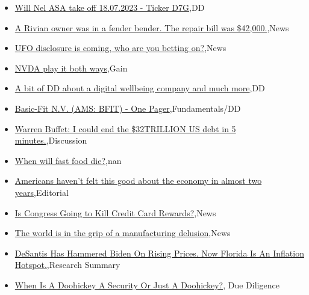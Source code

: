 \documentclass{article}%
\begin{document}
%
\begin{itemize}%
\item%
\href{https://reddit.com/r/wallstreetbets/comments/150759x/will\_nel\_asa\_take\_off\_18072023\_ticker\_d7g/}{Will Nel ASA take off 18.07.2023 - Ticker D7G},DD%
\item%
\href{https://reddit.com/r/wallstreetbets/comments/1502x32/a\_rivian\_owner\_was\_in\_a\_fender\_bender\_the\_repair/}{A Rivian owner was in a fender bender. The repair bill was \$42,000.},News%
\item%
\href{https://reddit.com/r/wallstreetbets/comments/1500kqc/ufo\_disclosure\_is\_coming\_who\_are\_you\_betting\_on/}{UFO disclosure is coming, who are you betting on?},News%
\item%
\href{https://reddit.com/r/wallstreetbets/comments/15000ez/nvda\_play\_it\_both\_ways/}{NVDA play it both ways},Gain%
\item%
\href{https://reddit.com/r/Baystreetbets/comments/1505t6w/a\_bit\_of\_dd\_about\_a\_digital\_wellbeing\_company\_and/}{A bit of DD about a digital wellbeing company and much more},DD%
\item%
\href{https://reddit.com/r/StockMarket/comments/14zzat4/basicfit\_nv\_ams\_bfit\_one\_pager/}{Basic-Fit N.V. (AMS: BFIT) - One Pager},Fundamentals/DD%
\item%
\href{https://reddit.com/r/StockMarket/comments/14zyxrw/warren\_buffet\_i\_could\_end\_the\_32trillion\_us\_debt/}{Warren Buffet: I could end the \$32TRILLION US debt in 5 minutes.},Discussion%
\item%
\href{https://reddit.com/r/Economics/comments/1500pss/when\_will\_fast\_food\_die/}{When will fast food die?},nan%
\item%
\href{https://reddit.com/r/Economics/comments/14zvi0j/americans\_havent\_felt\_this\_good\_about\_the\_economy/}{Americans haven't felt this good about the economy in almost two years},Editorial%
\item%
\href{https://reddit.com/r/Economics/comments/14zr08n/is\_congress\_going\_to\_kill\_credit\_card\_rewards/}{Is Congress Going to Kill Credit Card Rewards?},News%
\item%
\href{https://reddit.com/r/Economics/comments/14zqpi5/the\_world\_is\_in\_the\_grip\_of\_a\_manufacturing/}{The world is in the grip of a manufacturing delusion},News%
\item%
\href{https://reddit.com/r/Economics/comments/14zmrof/desantis\_has\_hammered\_biden\_on\_rising\_prices\_now/}{DeSantis Has Hammered Biden On Rising Prices. Now Florida Is An Inflation Hotspot.},Research Summary%
\item%
\href{https://reddit.com/r/Superstonk/comments/14zww7d/when\_is\_a\_doohickey\_a\_security\_or\_just\_a\_doohickey/}{When Is A Doohickey A Security Or Just A Doohickey?}, Due Diligence%
\end{itemize}%
\end{document}
